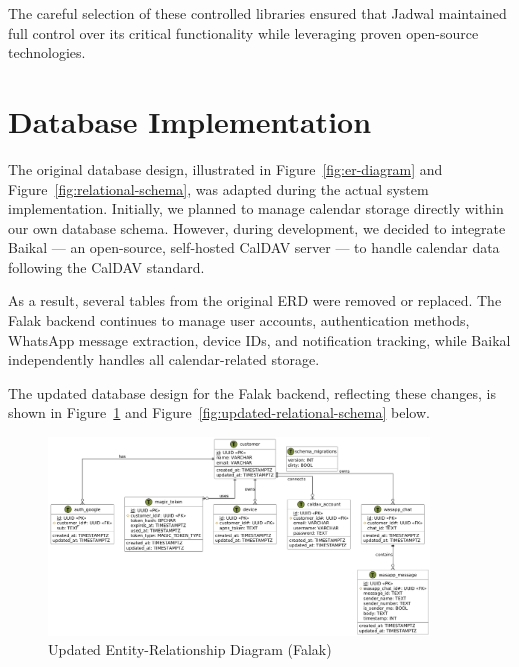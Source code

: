 The careful selection of these controlled libraries ensured that Jadwal maintained full control over its critical functionality while leveraging proven open-source technologies.


\section{Database Implementation}

The original database design, illustrated in Figure~\ref{fig:er-diagram} and Figure~\ref{fig:relational-schema}, was adapted during the actual system implementation. Initially, we planned to manage calendar storage directly within our own database schema. However, during development, we decided to integrate Baikal — an open-source, self-hosted CalDAV server — to handle calendar data following the CalDAV standard.

As a result, several tables from the original ERD were removed or replaced. The Falak backend continues to manage user accounts, authentication methods, WhatsApp message extraction, device IDs, and notification tracking, while Baikal independently handles all calendar-related storage.

The updated database design for the Falak backend, reflecting these changes, is shown in Figure~\ref{fig:updated-er-diagram} and Figure~\ref{fig:updated-relational-schema} below.

\begin{figure}[!h]
    \centering
    \includegraphics[width=0.9\textwidth]{images/docs/diagrams/er/new-database/Updated Falak ERD.png}
    \caption{Updated Entity-Relationship Diagram (Falak)}
    \label{fig:updated-er-diagram}
\end{figure}


